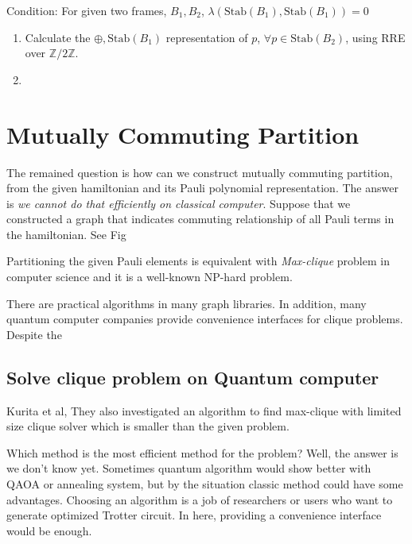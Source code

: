 \documentclass[a4paper,12pt]{article}
\begin{document}
Condition: For given two frames, $B_1, B_2$, $\lambda(\mbox{Stab}(B_1), \mbox{Stab}(B_1)) = 0$

\begin{enumerate}
    \item Calculate the $\oplus, \mbox{Stab}(B_1)$ representation of $p$, $\forall p \in \mbox{Stab}(B_2)$, using RRE over $\mathbb{Z}/2 \mathbb{Z}$.
    \item 
\end{enumerate}



\section{Mutually Commuting Partition}

The remained question is how can we construct mutually commuting partition, 
from the given hamiltonian and its Pauli polynomial representation.
The answer is \textit{we cannot do that efficiently on classical computer}.
Suppose that we constructed a graph that indicates commuting relationship
of all Pauli terms in the hamiltonian. See Fig %

Partitioning the given Pauli elements is equivalent with \textit{Max-clique}
problem in computer science and it is a well-known NP-hard problem\cite{karp_reducibility_1972}.

There are practical algorithms in many graph libraries.%
 In addition, many quantum computer companies provide convenience interfaces for clique problems. 
Despite the

\subsection{Solve clique problem on Quantum computer}

Kurita et al, 
They also investigated an algorithm to find max-clique with limited size clique solver
which is smaller than the given problem.

Which method is the most efficient method for the problem? 
Well, the answer is we don't know yet. 
Sometimes quantum algorithm would show better with QAOA or annealing system,
but by the situation classic method could have some advantages.
Choosing an algorithm is a job of researchers or users who want to generate optimized 
Trotter circuit. In here, providing a convenience interface would be enough.

%
\end{document}
